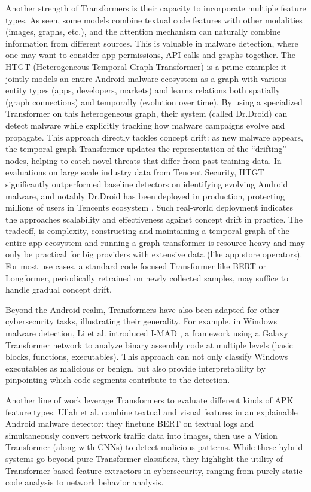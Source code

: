 Another strength of Transformers is their capacity to incorporate multiple feature types. 
As seen, some models combine textual code features with other modalities (images, graphs, etc.), 
and the attention mechanism can naturally combine information from different sources. 
This is valuable in malware detection, where one may want to consider app permissions, 
API calls and graphs together. 
The HTGT (Heterogeneous Temporal Graph Transformer) 
\cite{htgt}
is a prime example: 
it jointly models an entire Android malware ecosystem as a graph with various entity types 
(apps, developers, markets) and learns relations both spatially (graph connections) and temporally 
(evolution over time). 
By using a specialized Transformer on this heterogeneous graph, 
their system (called Dr.Droid) can detect malware while explicitly tracking how malware campaigns 
evolve and propagate. 
This approach directly tackles concept drift: as new malware appears, 
the temporal graph Transformer updates the representation of the “drifting” nodes, 
helping to catch novel threats that differ from past training data. 
In evaluations on large scale industry data from Tencent Security, 
HTGT significantly outperformed baseline detectors on identifying evolving Android malware, 
and notably Dr.Droid has been deployed in production, protecting millions of users in Tencents ecosystem
\cite{htgt}
. Such real-world deployment indicates the approaches scalability and effectiveness against concept drift 
in practice. 
The tradeoff, is complexity, constructing and maintaining a temporal graph of the entire app 
ecosystem and running a graph transformer is resource heavy and may only be practical for big providers 
with extensive data (like app store operators). 
For most use cases, a standard code focused Transformer like BERT or Longformer, 
periodically retrained on newly collected samples, may suffice to handle gradual concept drift. 

Beyond the Android realm, Transformers have also been adapted for other cybersecurity tasks, 
illustrating their generality. 
For example, in Windows malware detection, Li et al. introduced I-MAD
\cite{imad}
, a framework using a Galaxy Transformer network to analyze binary assembly code at multiple levels 
(basic blocks, functions, executables). 
This approach can not only classify Windows executables as malicious or benign, 
but also provide interpretability by pinpointing which code segments contribute to the detection. 

Another line of work leverage Transformers to evaluate different kinds of APK feature types. 
Ullah et al. 
\cite{vision_language_transformer} 
combine textual and visual features in an explainable Android malware detector: 
they finetune BERT on textual logs and simultaneously convert network traffic data into images, 
then use a Vision Transformer (along with CNNs) to detect malicious patterns. 
While these hybrid systems go beyond pure Transformer classifiers, 
they highlight the utility of Transformer based feature extractors in cybersecurity, 
ranging from purely static code analysis to network behavior analysis. 

